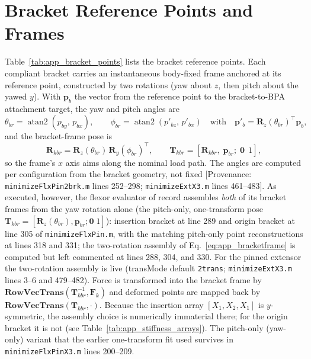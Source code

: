 \section{Bracket Reference Points and Frames}

Table~\ref{tab:app_bracket_points} lists the bracket reference points. Each compliant bracket carries an instantaneous body-fixed frame anchored at its reference point, constructed by two rotations (yaw about $z$, then pitch about the yawed $y$). With $\mathbf{p}_{b}$ the vector from the reference point to the bracket-to-BPA attachment target, the yaw and pitch angles are
\begin{equation}
    \theta_{br} = \operatorname{atan2}(p_{by},\, p_{bx}),
    \qquad
    \phi_{br} = \operatorname{atan2}(p'_{bz},\, p'_{bx})
    \quad\text{with}\quad
    \mathbf{p}'_{b} = \mathbf{R}_{z}(\theta_{br})^{\top}\mathbf{p}_{b},
    \label{eq:app_bracketangles}
\end{equation}
and the bracket-frame pose is
\begin{equation}
    \mathbf{R}_{kbr} = \mathbf{R}_{z}(\theta_{br})\,\mathbf{R}_{y}(\phi_{br})^{\top},
    \qquad
    \mathbf{T}_{kbr} = \left[\mathbf{R}_{kbr},\; \mathbf{p}_{br};\; \mathbf{0}\;\,1\right],
    \label{eq:app_bracketframe}
\end{equation}
so the frame's $x$ axis aims along the nominal load path. The angles are computed per configuration from the bracket geometry, not fixed [Provenance: \texttt{minimizeFlxPin2brk.m} lines 252--298; \texttt{minimizeExtX3.m} lines 461--483]. As executed, however, the flexor evaluator of record assembles \emph{both} of its bracket frames from the yaw rotation alone (the pitch-only, one-transform pose $\mathbf{T}_{kbr} = [\mathbf{R}_{z}(\theta_{br}), \mathbf{p}_{br}; \mathbf{0}\;1]$): insertion bracket at line 289 and origin bracket at line 305 of \texttt{minimizeFlxPin.m}, with the matching pitch-only point reconstructions at lines 318 and 331; the two-rotation assembly of Eq.~\eqref{eq:app_bracketframe} is computed but left commented at lines 288, 304, and 330. For the pinned extensor the two-rotation assembly is live (transMode default \texttt{2trans}; \texttt{minimizeExtX3.m} lines 3--6 and 479--482). Force is transformed into the bracket frame by $\mathbf{RowVecTrans}(\mathbf{T}_{kbr}^{-1}, \mathbf{F}_{k})$ and deformed points are mapped back by $\mathbf{RowVecTrans}(\mathbf{T}_{kbr}, \cdot)$. Because the insertion array $[X_{1},X_{2},X_{1}]$ is $y$-symmetric, the assembly choice is numerically immaterial there; for the origin bracket it is not (see Table~\ref{tab:app_stiffness_arrays}). The pitch-only (yaw-only) variant that the earlier one-transform fit used survives in \texttt{minimizeFlxPinX3.m} lines 200--209.
